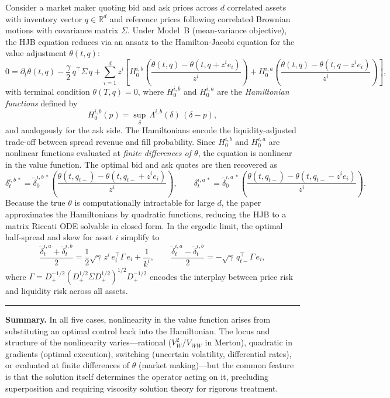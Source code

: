 \documentclass[11pt,a4paper]{article}
\begin{document}
Consider a market maker quoting bid and ask prices across $d$ correlated assets with inventory vector
$q\in\mathbb{R}^d$ and reference prices following correlated Brownian motions with covariance matrix
$\Sigma$. Under Model~B (mean-variance objective), the HJB equation reduces via an ansatz to the
Hamilton-Jacobi equation for the value adjustment $\theta(t,q)$:
\[
  0 = \partial_t\theta(t,q) - \frac{\gamma}{2}\,q^\top\Sigma\, q
  + \sum_{i=1}^{d} z^i\left[
    H^{i,b}_0\!\!\left(\frac{\theta(t,q)-\theta(t,q+z^i e_i)}{z^i}\right)
    + H^{i,a}_0\!\!\left(\frac{\theta(t,q)-\theta(t,q-z^i e_i)}{z^i}\right)
  \right],
\]
with terminal condition $\theta(T,q)=0$, where $H^{i,b}_0$ and $H^{i,a}_0$ are the \emph{Hamiltonian
functions} defined by
\[
  H^{i,b}_0(p) = \sup_{\delta}\,\Lambda^{i,b}(\delta)\,(\delta - p),
\]
and analogously for the ask side. The Hamiltonians encode the liquidity-adjusted trade-off between
spread revenue and fill probability. Since $H^{i,b}_0$ and $H^{i,a}_0$ are nonlinear functions evaluated
at \emph{finite differences of $\theta$}, the equation is nonlinear in the value function. The optimal
bid and ask quotes are then recovered as
\[
  \delta^{i,b\,*}_t = \tilde\delta^{i,b\,*}_0\!\left(
    \frac{\theta(t,q_{t-}) - \theta(t,q_{t-}+z^i e_i)}{z^i}
  \right), \qquad
  \delta^{i,a\,*}_t = \tilde\delta^{i,a\,*}_0\!\left(
    \frac{\theta(t,q_{t-}) - \theta(t,q_{t-}-z^i e_i)}{z^i}
  \right).
\]
Because the true $\theta$ is computationally intractable for large $d$, the paper approximates the
Hamiltonians by quadratic functions, reducing the HJB to a matrix Riccati ODE solvable in closed form.
In the ergodic limit, the optimal half-spread and skew for asset $i$ simplify to
\[
  \frac{\breve\delta^{i,a}_t + \breve\delta^{i,b}_t}{2}
  = \frac{1}{2}\sqrt{\gamma}\,z^i\,e_i^\top \Gamma\, e_i + \frac{1}{k^i},
  \qquad
  \frac{\breve\delta^{i,a}_t - \breve\delta^{i,b}_t}{2}
  = -\sqrt{\gamma}\,q_{t-}^\top \Gamma\, e_i,
\]
where $\Gamma = D_+^{-1/2}(D_+^{1/2}\Sigma D_+^{1/2})^{1/2}D_+^{-1/2}$ encodes the interplay between
price risk and liquidity risk across all assets.

\bigskip
\hrule
\bigskip

\noindent\small
\textbf{Summary.} In all five cases, nonlinearity in the value function arises from substituting an
optimal control back into the Hamiltonian. The locus and structure of the nonlinearity varies---rational
($V_W^2/V_{WW}$ in Merton), quadratic in gradients (optimal execution), switching (uncertain volatility,
differential rates), or evaluated at finite differences of $\theta$ (market making)---but the common
feature is that the solution itself determines the operator acting on it, precluding superposition and
requiring viscosity solution theory for rigorous treatment.
\end{document}
